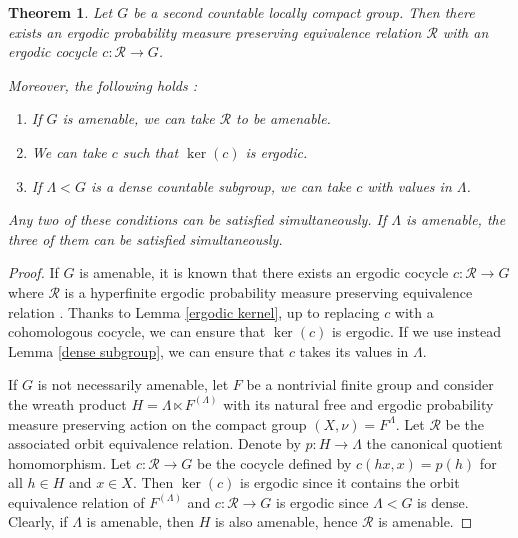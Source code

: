\documentclass[a4paper,11pt]{amsart}
\numberwithin{equation}{section}
\newtheorem{theorem}{Theorem}[section]
\theoremstyle{definition}
\newcommand{\cR}{\mathcal{R}}
\begin{document}
\begin{theorem} \label{model ergodic kernel dense subgroup measure preserving case}
    Let $G$ be a second countable locally compact group. Then there exists an ergodic probability measure preserving equivalence relation $\cR$ with an ergodic cocycle $c : \cR \rightarrow G$.

    Moreover, the following holds :
    \begin{enumerate}
        \item If $G$ is amenable, we can take $\cR$ to be amenable.
        \item We can take $c$ such that $\ker(c)$ is ergodic.
        \item If $\Lambda < G$ is a dense countable subgroup, we can take $c$ with values in $\Lambda$.
    \end{enumerate}
    Any two of these conditions can be satisfied simultaneously. If $\Lambda$ is amenable, the three of them can be satisfied simultaneously.
\end{theorem} 
\begin{proof}
    If $G$ is amenable, it is known that there exists an ergodic cocycle $c : \cR \rightarrow G$ where $\cR$ is a hyperfinite ergodic probability measure preserving equivalence relation \cite{GS83a, GS83b}. Thanks to Lemma \ref{ergodic kernel}, up to replacing $c$ with a cohomologous cocycle, we can ensure that $\ker(c)$ is ergodic. If we use instead Lemma \ref{dense subgroup}, we can ensure that $c$ takes its values in $\Lambda$.

    If $G$ is not necessarily amenable, let $F$ be a nontrivial finite group and consider the wreath product $H = \Lambda \ltimes F^{(\Lambda)}$ with its natural free and ergodic probability measure preserving action on the compact group $(X, \nu) = F^\Lambda$. Let $\cR$ be the associated orbit equivalence relation.  Denote by  $p : H \to \Lambda$ the canonical quotient homomorphism. Let $c : \cR \rightarrow G$ be the cocycle defined by $c(hx, x)= p(h)$ for all $h \in H$ and $x \in X$. Then $\ker(c)$ is ergodic since it contains the orbit equivalence relation of $F^{(\Lambda)}$ and $c : \cR \rightarrow G$ is ergodic since $\Lambda < G$ is dense. Clearly, if $\Lambda$ is amenable, then $H$ is also amenable, hence $\cR$ is amenable.
\end{proof}
\end{document}
